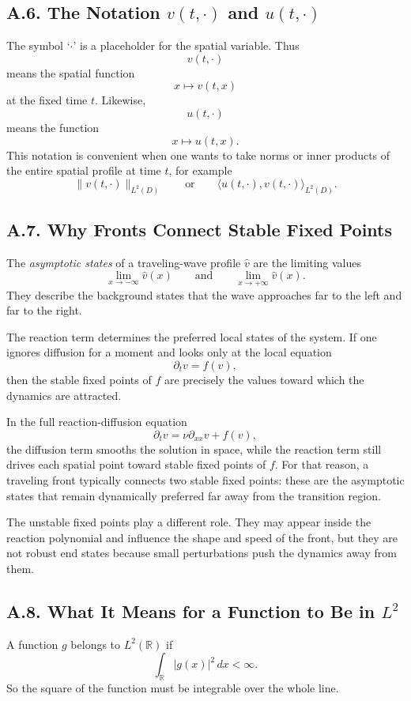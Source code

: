 \documentclass[11pt]{article}
\theoremstyle{definition}
\theoremstyle{remark}
\begin{document}
\subsection*{A.6. The Notation $v(t,\cdot)$ and $u(t,\cdot)$}
The symbol `$\cdot$' is a placeholder for the spatial variable. Thus
\[
v(t,\cdot)
\]
means the spatial function
\[
x\mapsto v(t,x)
\]
at the fixed time $t$. Likewise,
\[
u(t,\cdot)
\]
means the function
\[
x\mapsto u(t,x).
\]
This notation is convenient when one wants to take norms or inner products of the entire spatial profile at time $t$, for example
\[
\|v(t,\cdot)\|_{L^2(D)}
\qquad\text{or}\qquad
\langle u(t,\cdot),v(t,\cdot)\rangle_{L^2(D)}.
\]

\subsection*{A.7. Why Fronts Connect Stable Fixed Points}
The \emph{asymptotic states} of a traveling-wave profile $\hat v$ are the limiting values
\[
\lim_{x\to-\infty}\hat v(x)
\qquad\text{and}\qquad
\lim_{x\to+\infty}\hat v(x).
\]
They describe the background states that the wave approaches far to the left and far to the right.

The reaction term determines the preferred local states of the system. If one ignores diffusion for a moment and looks only at the local equation
\[
\partial_t v=f(v),
\]
then the stable fixed points of $f$ are precisely the values toward which the dynamics are attracted.

In the full reaction-diffusion equation
\[
\partial_t v=\nu\partial_{xx}v+f(v),
\]
the diffusion term smooths the solution in space, while the reaction term still drives each spatial point toward stable fixed points of $f$. For that reason, a traveling front typically connects two stable fixed points: these are the asymptotic states that remain dynamically preferred far away from the transition region.

The unstable fixed points play a different role. They may appear inside the reaction polynomial and influence the shape and speed of the front, but they are not robust end states because small perturbations push the dynamics away from them.

\subsection*{A.8. What It Means for a Function to Be in $L^2$}
A function $g$ belongs to $L^2(\mathbb R)$ if
\[
\int_{\mathbb R}|g(x)|^2\,dx<\infty.
\]
So the square of the function must be integrable over the whole line.
\end{document}
